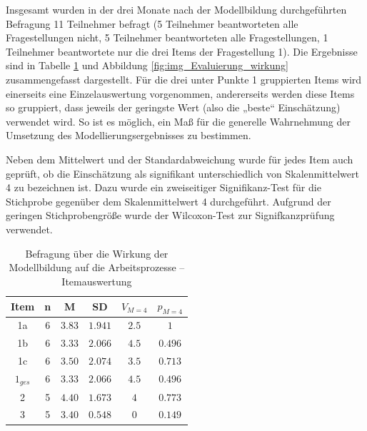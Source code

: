 Insgesamt wurden in der drei Monate nach der Modellbildung durchgeführten Befragung 11 Teilnehmer befragt (5 Teilnehmer beantworteten alle Fragestellungen nicht, 5 Teilnehmer beantworteten alle Fragestellungen, 1 Teilnehmer beantwortete nur die drei Items der Fragestellung 1). Die Ergebnisse sind in Tabelle \ref{tab:wirkung} und Abbildung \ref{fig:img_Evaluierung_wirkung} zusammengefasst dargestellt. Für die drei unter Punkte 1 gruppierten Items wird einerseits eine Einzelauswertung vorgenommen, andererseits werden diese Items so gruppiert, dass jeweils der geringste Wert (also die „beste“ Einschätzung) verwendet wird. So ist es möglich, ein Maß für die generelle Wahrnehmung der Umsetzung des Modellierungsergebnisses zu bestimmen.

Neben dem Mittelwert und der Standardabweichung wurde für jedes Item auch geprüft, ob die Einschätzung als signifikant unterschiedlich von Skalenmittelwert 4 zu bezeichnen ist. Dazu wurde ein zweiseitiger Signifikanz-Test für die Stichprobe gegenüber dem Skalenmittelwert 4 durchgeführt. Aufgrund der geringen Stichprobengröße wurde der Wilcoxon-Test zur Signifkanzprüfung verwendet.

\begin{table}[htbp]
	\centering
	\caption{Befragung über die Wirkung der Modellbildung auf die Arbeitsprozesse -- Itemauswertung}

\begin{tabular}{| c || c | c | c || c | c |}
  \hline
   Item & n & M & SD & $V_{M=4}$ & $p_{M=4}$ \\ \hline
   1a         & 6 & $3.83$ & $1.941$ & $2.5$ & $1$ \\ 
   1b         & 6 & $3.33$ & $2.066$ & $4.5$ & $0.496$ \\ 
   1c         & 6 & $3.50$ & $2.074$ & $3.5$ & $0.713$ \\ 
   $1_{ges}$  & 6 & $3.33$ & $2.066$ & $4.5$ & $0.496$ \\ 
   2          & 5 & $4.40$ & $1.673$ & $4$ & $0.773$ \\ 
   3          & 5 & $3.40$ & $0.548$ & $0$ & $0.149$ \\ \hline
\end{tabular} \\ 
	\label{tab:wirkung}
\end{table}

